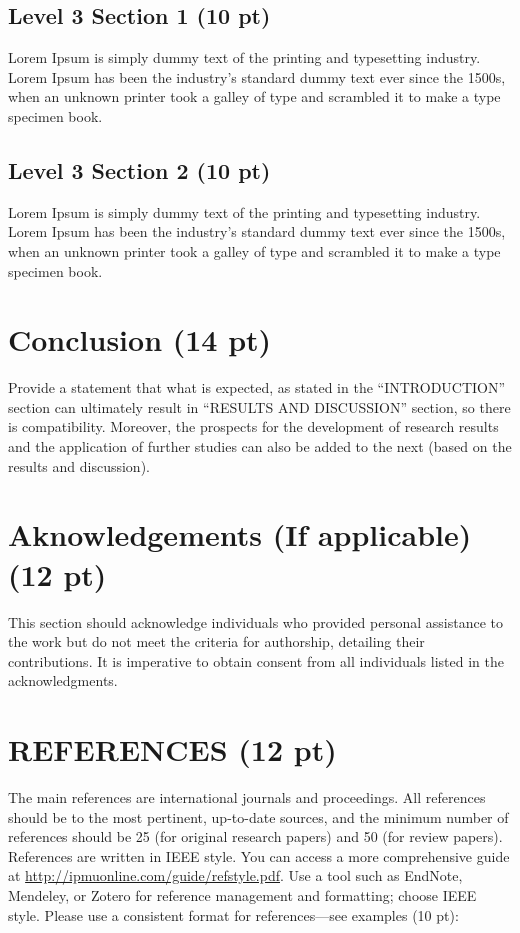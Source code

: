 \documentclass[10pt,a4paper]{article}
\begin{document}
\subsection{Level 3 Section 1 (10 pt)}

Lorem Ipsum is simply dummy text of the printing and typesetting industry. Lorem Ipsum has been the industry's standard dummy text ever since the 1500s, when an unknown printer took a galley of type and scrambled it to make a type specimen book.

\subsection{Level 3 Section 2 (10 pt)}

Lorem Ipsum is simply dummy text of the printing and typesetting industry. Lorem Ipsum has been the industry's standard dummy text ever since the 1500s, when an unknown printer took a galley of type and scrambled it to make a type specimen book.

\section{Conclusion (14 pt)}

Provide a statement that what is expected, as stated in the ``INTRODUCTION'' section can ultimately result in ``RESULTS AND DISCUSSION'' section, so there is compatibility. Moreover, the prospects for the development of research results and the application of further studies can also be added to the next (based on the results and discussion).

\section*{Aknowledgements (If applicable) (12 pt)}

This section should acknowledge individuals who provided personal assistance to the work but do not meet the criteria for authorship, detailing their contributions. It is imperative to obtain consent from all individuals listed in the acknowledgments.

\section*{REFERENCES (12 pt)}

{\fontsize{8pt}{10pt}\selectfont
The main references are international journals and proceedings. All references should be to the most pertinent, up-to-date sources, and the minimum number of references should be 25 (for original research papers) and 50 (for review papers). References are written in IEEE style. You can access a more comprehensive guide at \url{http://ipmuonline.com/guide/refstyle.pdf}. Use a tool such as EndNote, Mendeley, or Zotero for reference management and formatting; choose IEEE style. Please use a consistent format for references---see examples (10 pt):\par}
\end{document}
